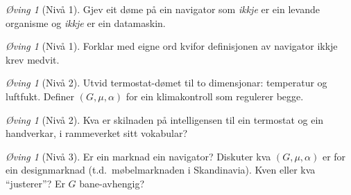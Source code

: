 \documentclass[10pt]{book}
\theoremstyle{definition}
\theoremstyle{plain}
\theoremstyle{remark}
\newtheorem{exercise}[definisjon]{\O{}ving}
\begin{document}
\begin{exercise}[Niv\aa{} 1]\label{ex:5.1}
Gjev eit d\o me p\aa{} ein navigator som \emph{ikkje} er ein levande organisme og \emph{ikkje} er ein datamaskin.
\end{exercise}

\begin{exercise}[Niv\aa{} 1]\label{ex:5.2}
Forklar med eigne ord kvifor definisjonen av navigator ikkje krev medvit.
\end{exercise}

\begin{exercise}[Niv\aa{} 2]\label{ex:5.3}
Utvid termostat-d\o met til to dimensjonar: temperatur og luftfukt. Definer $(G, \mu, \alpha)$ for ein klimakontroll som regulerer begge.
\end{exercise}

\begin{exercise}[Niv\aa{} 2]\label{ex:5.4}
Kva er skilnaden p\aa{} intelligensen til ein termostat og ein handverkar, i rammeverket sitt vokabular?
\end{exercise}

\begin{exercise}[Niv\aa{} 3]\label{ex:5.5}
Er ein marknad ein navigator? Diskuter kva $(G, \mu, \alpha)$ er for ein designmarknad (t.d.\ m\o belmarknaden i Skandinavia). Kven eller kva ``justerer''? Er $G$ bane-avhengig?
\end{exercise}



\end{document}
